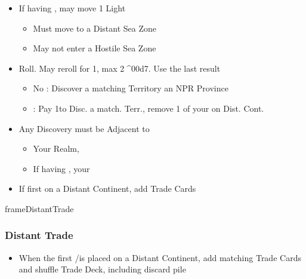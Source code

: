 \documentclass[10pt]{article}
\newlength{\fhDistantTrade} \setlength\fhDistantTrade{4\baselineskip}
\begin{document}
\begin{itemize}
	\item If having , may move 1 Light \ship
	\begin{itemize}
		\item Must move to a Distant Sea Zone
		\item May not enter a Hostile Sea Zone
	\end{itemize}
	\item Roll. May reroll for 1\diplopower, max 2^^^^00d7. Use the last result
	\begin{itemize}
		\item No \skull: Discover a matching Territory  an NPR Province  \town {} \vassal
		\item \skull: Pay 1\diplopower to Disc. a match. Terr.,  remove 1 of your \ships on Dist. Cont.
	\end{itemize}
	\item Any Discovery must be Adjacent to
	\begin{itemize}
		\item Your Realm, 
		\item If having , your \ship
	\end{itemize}
	\item If first \claim on a Distant Continent, add Trade Cards
\end{itemize}
\begin{dynamiccontents*}{frameDistantTrade}\begin{eubox}{\fhDistantTrade}
	\subsubsection*{Distant Trade }
	\begin{itemize}
		\item When the first \claim/\dnpr is placed on a Distant Continent, add matching Trade Cards and shuffle Trade Deck, including discard pile
	\end{itemize}
\end{eubox}\end{dynamiccontents*}
\end{document}
